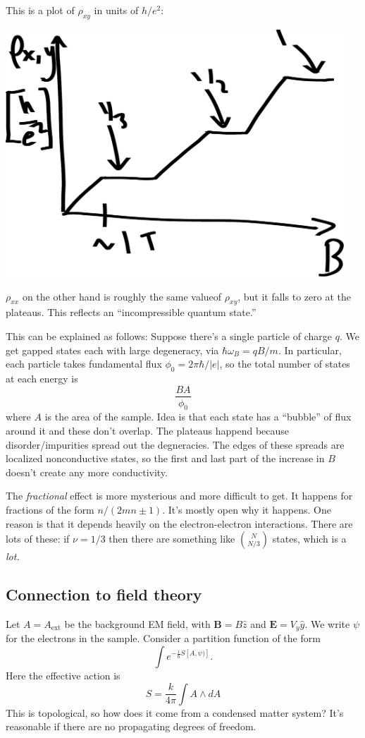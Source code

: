 This is a plot of $\rho_{xy}$ in units of $h/e^2$:
\begin{center}
\includegraphics[width = 5in]{fig/quantum-hall-graph.pdf}
\end{center}
$\rho_{xx}$ on the other hand is roughly the same valueof $\rho_{xy}$, but it falls to zero at the plateaus.
This reflects an ``incompressible quantum state.''

This can be explained as follows:  Suppose there's a single particle of charge $q$.
We get gapped states each with large degeneracy, via $\hbar \omega_B = q B/m$.
In particular, each particle takes fundamental flux $\phi_0 = 2 \pi \hbar / |e|$, so the total number of states at each energy is
\[
\frac{BA}{\phi_0}
\]
where $A$ is the area of the sample.
Idea is that each state has a ``bubble'' of flux around it and these don't overlap.
The plateaus happend because disorder/impurities spread out the degneracies.
The edges of these spreads are localized nonconductive states, so the first and last part of the increase in $B$ doesn't create any more conductivity.

The \emph{fractional} effect is more mysterious and more difficult to get.
It happens for fractions of the form $n/(2mn \pm 1)$.
It's mostly open why it happens.
One reason is that it depends heavily on the electron-electron interactions.
There are lots of these: if $\nu = 1/3$ then there are something like $\binom{N}{N/3}$ states, which is a \emph{lot.}

\subsection*{Connection to field theory}
Let $A = A_{\text{ext}}$ be the background EM field, with $\mathbf B = B \hat z$ and $\mathbf E = V_y \hat y$.
We write $\psi$ for the electrons in the sample.
Consider a partition function of the form
\[
\int e^{-\frac{i}{\hbar} S[A, \psi)]}.
\]
Here the effective action is
\[
S = \frac{k}{4 \pi} \int A \wedge dA
\]
This is topological, so how does it come from a condensed matter system?
It's reasonable if there are no propagating degrees of freedom.

